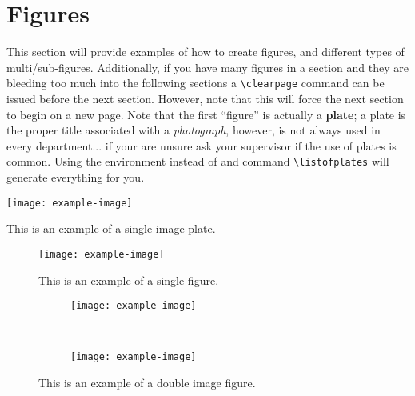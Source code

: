 	\section{Figures}
		This section will provide examples of how to create figures, and different types of multi/sub-figures. 
		Additionally, if you have many figures in a section and they are bleeding too much into the following sections a \lstinline|\clearpage| command can be issued before the next section. 
		However, note that this will force the next section to begin on a new page. 
		Note that the first \enquote{figure} is actually a \textbf{plate}; a plate is the proper title associated with a \textit{photograph}, however, is not always used in every department... if your are unsure ask your supervisor if the use of plates is common. Using the environment  instead of  and command \lstinline|\listofplates| will generate everything for you.
		\begin{plate}[H]
			\centering
			\texttt{[image: example-image]}
			\caption{This is an example of a single image plate.}
			\label{plate:singleImage}
		\end{plate}
  
		\begin{figure}[H]
			\centering
			\texttt{[image: example-image]}
			\caption{This is an example of a single figure.}
			\label{fig:singleImage}
		\end{figure}
		\begin{figure}[H]
			\centering
			\begin{subfigure}{0.45\textwidth}
				\texttt{[image: example-image]}
				\caption{} %
				\label{fig:doubleImage:a}
			\end{subfigure}
			~
			\begin{subfigure}{0.45\textwidth}
				\texttt{[image: example-image]}
				\caption{} %
				\label{fig:doubleImage:b}
			\end{subfigure}
			\caption{This is an example of a double image figure.}
			\label{fig:doubleImage}
		\end{figure}
	  
